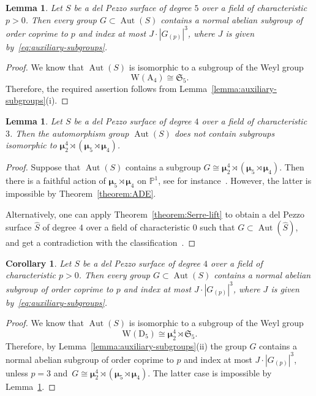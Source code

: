 \documentclass[12pt]{amsart}
\numberwithin{equation}{section}
\newtheorem{corollary}[subsection]{Corollary}
\newtheorem{lemma}[subsection]{Lemma}
\theoremstyle{definition}
\newcommand{\mumu}{\boldsymbol{\mu}}
\newcommand{\WD}{\mathrm{W}(\mathrm{D}_5)}
\newcommand{\PP}{\mathbb P}
\DeclareMathOperator{\Aut}{Aut}
\begin{document}
\begin{lemma}\label{lemma:dP5}
Let $S$ be a del Pezzo surface of degree $5$ over a field
of characteristic $p>0$.
Then every group $G\subset\Aut(S)$ contains a normal abelian subgroup of order
coprime to $p$
and index at most $J\cdot |G_{(p)}|^3$, where $J$ is given by~\eqref{eq:auxiliary-subgroups}.
\end{lemma}

\begin{proof}
We know that $\Aut(S)$ is isomorphic to a subgroup of the Weyl group
$$
\mathrm{W}(\mathrm{A}_4)\cong \mathfrak{S}_5.
$$
Therefore, the required assertion follows from Lemma~\ref{lemma:auxiliary-subgroups}(i).
\end{proof}


\begin{lemma}\label{lemma:dP4-forbidden}
Let $S$ be a del Pezzo surface of degree $4$ over a field of characteristic $3$.
Then the automorphism group $\Aut(S)$ does not contain subgroups isomorphic to
$\mumu_2^4\rtimes(\mumu_5\rtimes\mumu_4)$.
\end{lemma}

\begin{proof}
Suppose that $\Aut(S)$ contains a subgroup $G\cong\mumu_2^4\rtimes(\mumu_5\rtimes\mumu_4)$.
Then there is a faithful action of $\mumu_5\rtimes\mumu_4$ on $\PP^1$, see for instance~\mbox{\cite[\S3]{DD}}.
However, the latter is impossible by Theorem~\ref{theorem:ADE}.

Alternatively, one can apply Theorem~\ref{theorem:Serre-lift} to obtain a del Pezzo
surface $\hat{S}$ of degree $4$ over a field of characteristic $0$
such that $G\subset\Aut(\hat{S})$, and get a contradiction
with the classification~\mbox{\cite[\S8.6.4]{Dolgachev}}.
\end{proof}

\begin{corollary}\label{corollary:dP4}
Let $S$ be a del Pezzo surface of degree $4$ over a field
of characteristic $p>0$.
Then every group $G\subset\Aut(S)$ contains a normal abelian subgroup of order
coprime to $p$
and index at most $J\cdot |G_{(p)}|^3$, where $J$ is given by~\eqref{eq:auxiliary-subgroups}.
\end{corollary}

\begin{proof}
We know that $\Aut(S)$ is isomorphic to a subgroup of the Weyl group
$$
\WD\cong\mumu_2^4\rtimes\mathfrak{S}_5.
$$
Therefore, by Lemma~\ref{lemma:auxiliary-subgroups}(ii) the group $G$ contains a normal abelian subgroup of order coprime to $p$
and index at most $J\cdot |G_{(p)}|^3$, unless $p=3$
and~\mbox{$G\cong\mumu_2^4\rtimes(\mumu_5\rtimes\mumu_4)$}. The latter case is impossible
by Lemma~\ref{lemma:dP4-forbidden}.
\end{proof}
\end{document}
